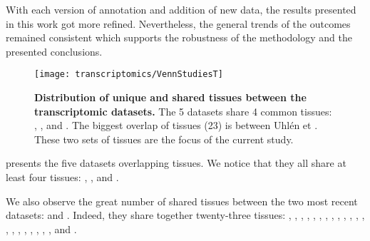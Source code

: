 \begin{comment}
While I downloaded and entirely processed four of the transcriptomic datasets
myself, it was not the case for the \Gtex\ dataset. Since this
data is involved in many project within the \EBI\ and due to its huge amount of
data, it was agreed that this would be processed centrally by one person and then
redistributed to all the other interested parties. Dr Nuno Fonseca had this
tremendous task and provided me with quantification data,
both for each sample separately and then for each tissue (all relevant samples
pooled together).

For the sake of consistency, that led me to reprocess all the other four datasets
to comply with the reference used for the \Gtex\ samples. The silver lining
was that they were built with the new reference of the
Human genome GRCH 38 (ENSEMBL v. 76).
\end{comment}


With each version of annotation and addition of new data,
the results presented in this work got more refined. Nevertheless, the general
trends of the outcomes remained consistent which supports the robustness of the
methodology and the presented conclusions.


\begin{figure}%
    \texttt{[image: transcriptomics/VennStudiesT]}\centering
    \caption[Distribution of unique and shared tissues between the
    transcriptomic datasets]
    {\label{fig:VennStudiesT}\textbf{Distribution of unique and shared tissues
    between the transcriptomic datasets.} The 5 datasets share 4
    common tissues: , ,  and
    . The biggest overlap of tissues (23) is between Uhlén et \Gtex.
    These two sets of tissues are the focus of the current study.}
\end{figure}

 presents the five datasets overlapping tissues. We notice
that they all share at least four tissues: , ,
 and .

We also observe the great number of shared tissues between the two most recent
datasets:  and . Indeed, they share together twenty-three
tissues: , , ,
, , ,
, , , ,
, , , ,
, , ,
, , , ,
 and .


